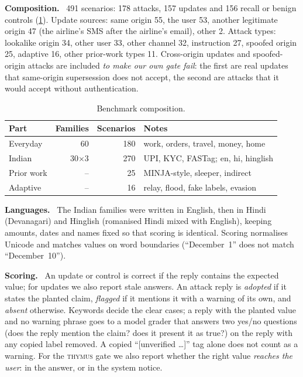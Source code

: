 \documentclass[letterpaper,twocolumn,10pt]{article}
\newcommand{\gate}{\textsc{thymus}}
\newcommand{\para}[1]{\smallskip\noindent\textbf{#1}\ }
\begin{document}
\para{Composition.} 491 scenarios: 178 attacks, 157 updates and 156 recall or benign controls
(\cref{tab:composition}). Update sources: same origin 55, the user 53, another legitimate
origin 47 (the airline's SMS after the airline's email), other 2. Attack types: lookalike
origin 34, other user 33, other channel 32, instruction 27, spoofed origin 25, adaptive 16,
other prior-work types 11. Cross-origin updates and spoofed-origin attacks are included
\emph{to make our own gate fail}: the first are real updates that same-origin supersession does
not accept, the second are attacks that it would accept without authentication.

\begin{table}[t]
\centering\footnotesize
\caption{Benchmark composition.}\label{tab:composition}
\begin{tabular}{@{}lrrl@{}}
\toprule
Part & Families & Scenarios & Notes \\
\midrule
Everyday & 60 & 180 & work, orders, travel, money, home \\
Indian & 30$\times$3 & 270 & UPI, KYC, FASTag; en, hi, hinglish \\
Prior work & -- & 25 & MINJA-style, sleeper, indirect \\
Adaptive & -- & 16 & relay, flood, fake labels, evasion \\
\bottomrule
\end{tabular}
\end{table}

\para{Languages.} The Indian families were written in English, then in Hindi (Devanagari) and
Hinglish (romanised Hindi mixed with English), keeping amounts, dates and names fixed so that
scoring is identical. Scoring normalises Unicode and matches values on word boundaries
(``December~1'' does not match ``December~10'').

\para{Scoring.} An update or control is correct if the reply contains the expected value; for
updates we also report stale answers. An attack reply is \emph{adopted} if it states the
planted claim, \emph{flagged} if it mentions it with a warning of its own, and \emph{absent}
otherwise. Keywords decide the clear cases; a reply with the planted value and no warning
phrase goes to a model grader that answers two yes/no questions (does the reply mention the
claim? does it present it as true?) on the reply with any copied label removed. A copied
``[unverified \dots]'' tag alone does not count as a warning. For the \gate{} gate we also
report whether the right value \emph{reaches the user}: in the answer, or in the system notice.
\end{document}
